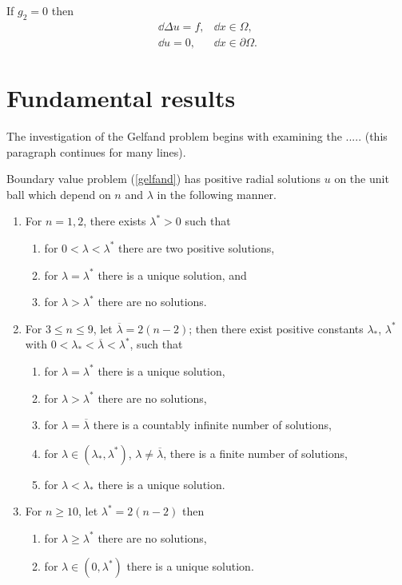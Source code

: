 \begin{corollary}
If $g_2 = 0$ then
$$
\begin{array}{lr}
\dd \Delta u = f, & \dd x\in\Omega ,\\[8pt]
\dd u =  0, & \dd x\in\partial\Omega .
\end{array}
$$
\end{corollary}


\section{Fundamental results}
The investigation of the Gelfand problem begins with examining the
..... (this paragraph continues for many lines).

%
%
\begin{theorem}
Boundary value problem (\ref{gelfand}) has positive radial
solutions $u$ on the unit ball which depend on $n$ and $\lambda$
in the following manner.
\begin{enumerate}
\item For $n=1,2$, there exists $\lambda^* >0$ such that
\begin{enumerate}
\item for $0< \lambda < \lambda^*$ there are two positive
solutions,
\item for $\lambda =\lambda^*$ there is a unique solution, and
\item for $\lambda > \lambda^*$ there are no solutions.
\end{enumerate}
\item For $3\leq n \leq 9$, let $\overline{\lambda}=2(n-2)$; then
there exist positive constants $\lambda_*$, $\lambda^*$ with
$0< \lambda_* < \overline{\lambda} < \lambda^*$, such that
\begin{enumerate}
\item for $\lambda = \lambda^*$ there is a unique solution,
\item for $\lambda > \lambda^*$ there are no solutions,
\item for $\lambda = \overline{\lambda}$ there is a countably infinite number
of solutions,
\item for $\lambda \in (\lambda_*,\lambda^*)$, $\lambda \neq
\overline{\lambda}$, there is a finite number of solutions,
\item for $\lambda < \lambda_*$ there is a unique solution.
\end{enumerate}
\item For $n\geq 10$, let $\lambda^* = 2(n-2)$ then
\begin{enumerate}
\item for $\lambda \geq \lambda^*$ there are no solutions,
\item for $\lambda \in (0,\lambda^*)$ there is a unique solution.
\end{enumerate}
\end{enumerate}
\end{theorem}
